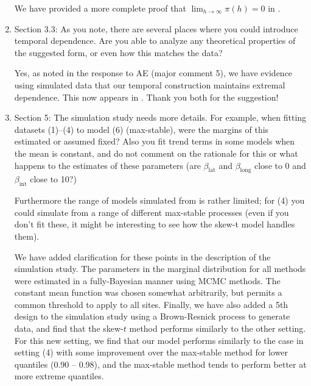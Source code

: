 \documentclass[11pt]{article}
\begin{document}
\begin{enumerate}[1.]
  \begin{response}
    We have provided a more complete proof that $\lim_{h \rightarrow \infty} \pi(h) = 0$ in .
  \end{response}

  \item Section 3.3: As you note, there are several places where you could introduce temporal dependence. Are you able to analyze any theoretical properties of the suggested form, or even how this matches the data? \\

  \begin{response}
    Yes, as noted in the response to AE (major comment 5), we have evidence using simulated data that our temporal construction maintains extremal dependence.
    This now appears in .
    Thank you both for the suggestion!
  \end{response}

  \item Section 5: The simulation study needs more details. For example, when fitting datasets (1)--(4) to model (6) (max-stable), were the margins of this estimated or assumed fixed? Also you fit trend terms in some models when the mean is constant, and do not comment on the rationale for this or what happens to the estimates of these parameters (are $\beta_\text{lat}$ and $\beta_\text{long}$ close to 0 and $\beta_\text{int}$ close to 10?)

  Furthermore the range of models simulated from is rather limited; for (4) you could simulate from a range of different max-stable processes (even if you don’t fit these, it might be interesting to see how the skew-t model handles them). \\

  \begin{response}
    We have added clarification for these points in the description of the simulation study.
    The parameters in the marginal distribution for all methods were estimated in a fully-Bayesian manner using MCMC methods.
    The constant mean function was chosen somewhat arbitrarily, but permits a common threshold to apply to all sites.
    Finally, we have also added a 5th design to the simulation study using a Brown-Resnick process to generate data, and find that the skew-$t$ method performs similarly to the other setting.
    For this new setting, we find that our model performs similarly to the case in setting (4) with some improvement over the max-stable method for lower quantiles (0.90 -- 0.98), and the max-stable method tends to perform better at more extreme quantiles.
  \end{response}


\end{enumerate}
\end{document}
